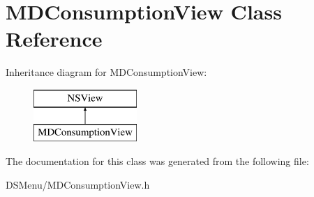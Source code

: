 \hypertarget{interface_m_d_consumption_view}{\section{M\-D\-Consumption\-View Class Reference}
\label{interface_m_d_consumption_view}
}
Inheritance diagram for M\-D\-Consumption\-View\-:\begin{figure}[H]
\begin{center}
\leavevmode
\includegraphics[height=2.000000cm]{interface_m_d_consumption_view}
\end{center}
\end{figure}


The documentation for this class was generated from the following file\-:\begin{DoxyCompactItemize}
\item 
D\-S\-Menu/M\-D\-Consumption\-View.\-h\end{DoxyCompactItemize}
